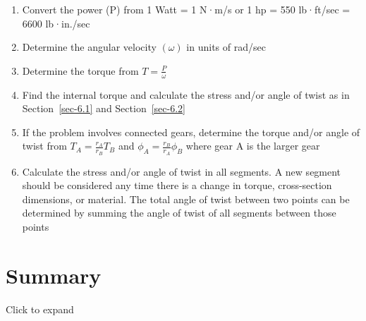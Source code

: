 \documentclass[
  letterpaper,
  DIV=11,
  numbers=noendperiod]{scrreprt}
\theoremstyle{definition}
\theoremstyle{remark}
\begin{document}
\begin{tcolorbox}[enhanced jigsaw, leftrule=.75mm, bottomrule=.15mm, opacityback=0, opacitybacktitle=0.6, colframe=quarto-callout-warning-color-frame, toprule=.15mm, colbacktitle=quarto-callout-warning-color!10!white, coltitle=black, bottomtitle=1mm, title={Step-by-step: Power Transmission}, titlerule=0mm, toptitle=1mm, colback=white, rightrule=.15mm, left=2mm, arc=.35mm, breakable]

\begin{enumerate}
\def\labelenumi{\arabic{enumi}.}
\item
  Convert the power (P) from 1 Watt = 1 N·m/s or 1 hp = 550 lb·ft/sec =
  6600 lb·in./sec
\item
  Determine the angular velocity \((\omega)\) in units of rad/sec
\item
  Determine the torque from \(T=\frac{P}{\omega}\)
\item
  Find the internal torque and calculate the stress and/or angle of
  twist as in Section~\ref{sec-6.1} and Section~\ref{sec-6.2}
\item
  If the problem involves connected gears, determine the torque and/or
  angle of twist from \(T_A=\frac{r_A}{r_B}T_B\) and
  \(\phi_A=\frac{r_B}{r_A}\phi_B\) where gear A is the larger gear
\item
  Calculate the stress and/or angle of twist in all segments. A new
  segment should be considered any time there is a change in torque,
  cross-section dimensions, or material. The total angle of twist
  between two points can be determined by summing the angle of twist of
  all segments between those points
\end{enumerate}

\end{tcolorbox}

\section{Summary}\label{summary-5}

Click to expand
\end{document}
